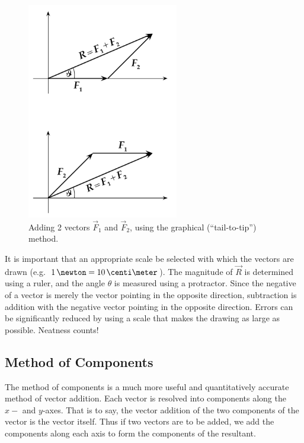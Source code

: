 \begin{figure}%
  \begin{center}
    \includegraphics[width=2.6in]{Experiment01Figures/Figure02.pdf}
  \end{center}
  \caption{Adding 2 vectors $\vec{F}_1$ and $\vec{F}_2$, using the graphical (``tail-to-tip'') method.}
  \label{M01Fig02}
\end{figure}

It is important that an appropriate scale be selected with which the vectors are drawn (e.g.\ $1\,\newton = 10\,\centi\meter$). The magnitude of $\vec{R}$ is determined using a ruler, and the angle $\theta$ is measured using a protractor.  Since the negative of a vector is merely the vector pointing in the opposite direction, subtraction is addition with the negative vector pointing in the opposite direction.  Errors can be significantly reduced by using a scale that makes the drawing as large as possible. Neatness counts!

\subsection{Method of Components}

The method of components is a much more useful and quantitatively accurate method of vector addition.  Each vector is resolved into components along the $x-$ and $y$-axes. That is to say, the vector addition of the two components of the vector is the vector itself.  Thus if two vectors are to be added, we add the components along each axis to form the components of the resultant.

